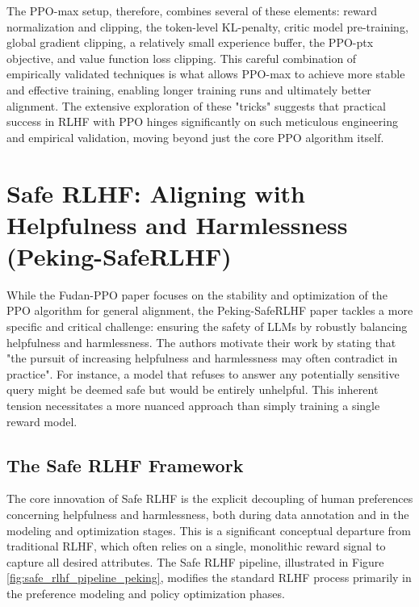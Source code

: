 \documentclass{article} %
\begin{document}
The PPO-max setup, therefore, combines several of these elements: reward normalization and clipping, the token-level KL-penalty, critic model pre-training, global gradient clipping, a relatively small experience buffer, the PPO-ptx objective, and value function loss clipping. \cite{Zheng2023PPO} This careful combination of empirically validated techniques is what allows PPO-max to achieve more stable and effective training, enabling longer training runs and ultimately better alignment. The extensive exploration of these "tricks" suggests that practical success in RLHF with PPO hinges significantly on such meticulous engineering and empirical validation, moving beyond just the core PPO algorithm itself.

\section{Safe RLHF: Aligning with Helpfulness and Harmlessness (Peking-SafeRLHF)}
\label{sec:peking_safe_rlhf}

While the Fudan-PPO paper focuses on the stability and optimization of the PPO algorithm for general alignment, the Peking-SafeRLHF paper \cite{Dai2023SafeRLHF} tackles a more specific and critical challenge: ensuring the safety of LLMs by robustly balancing helpfulness and harmlessness. The authors motivate their work by stating that "the pursuit of increasing helpfulness and harmlessness may often contradict in practice". \cite{Dai2023SafeRLHF} For instance, a model that refuses to answer any potentially sensitive query might be deemed safe but would be entirely unhelpful. This inherent tension necessitates a more nuanced approach than simply training a single reward model.

\subsection{The Safe RLHF Framework}
The core innovation of Safe RLHF is the explicit decoupling of human preferences concerning helpfulness and harmlessness, both during data annotation and in the modeling and optimization stages. \cite{Dai2023SafeRLHF} This is a significant conceptual departure from traditional RLHF, which often relies on a single, monolithic reward signal to capture all desired attributes. The Safe RLHF pipeline, illustrated in Figure \ref{fig:safe_rlhf_pipeline_peking}, modifies the standard RLHF process primarily in the preference modeling and policy optimization phases.

\end{document}
